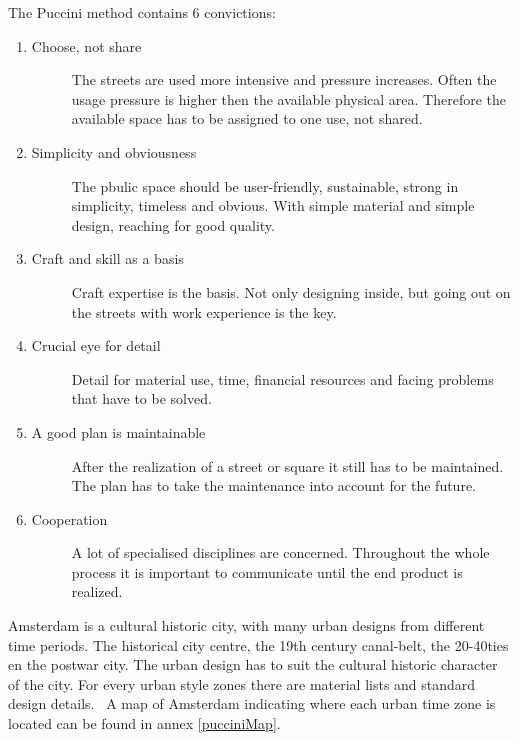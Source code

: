 The Puccini method contains 6 convictions:~\cite{puccini2014}
\begin{enumerate}
\item 	\begin{description}
		\item[Choose, not share] 
		The streets are used more intensive and pressure increases. Often the usage pressure is higher then the available physical area. Therefore the available space has to be assigned to one use, not shared. 
		\end{description}
\item \begin{description}
		\item[Simplicity and obviousness] 
		The pbulic space should be user-friendly, sustainable, strong in simplicity, timeless and obvious. With simple material and simple design, reaching for good quality.
		\end{description}
\item \begin{description}
		\item[Craft and skill as a basis] Craft expertise is the basis. Not only designing inside, but going out on the streets with work experience is the key. 
		\end{description}
\item \begin{description}
		\item[Crucial eye for detail] Detail for material use, time, financial resources and facing problems that have to be solved. 
		\end{description}
\item \begin{description}
		\item[A good plan is maintainable] After the realization of a street or square it still has to be maintained. The plan has to take the maintenance into account for the future. 
		\end{description}
\item \begin{description}
		\item[Cooperation] A lot of specialised disciplines are concerned. Throughout the whole process it is important to communicate until the end product is realized. 
		\end{description}
\end{enumerate}

Amsterdam is a cultural historic city, with many urban designs from different time periods. The historical city centre, the 19th century canal-belt, the 20-40ties en the postwar city.  The urban design has to suit the cultural historic character of the city. For every urban style zones there are material lists and standard design details.~\cite{puccini2014} A map of Amsterdam indicating where each urban time zone is located can be found in annex \ref{pucciniMap}.
	
